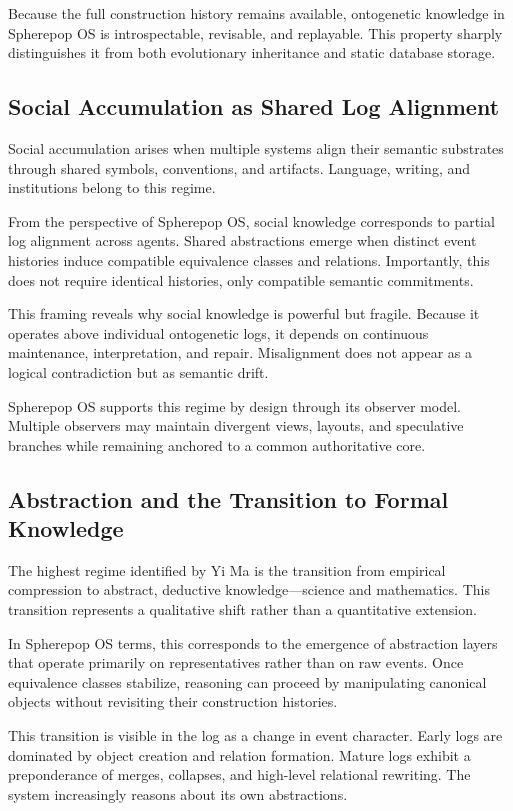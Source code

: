 \documentclass[11pt]{article}
\begin{document}
Because the full construction history remains available, ontogenetic
knowledge in Spherepop OS is introspectable, revisable, and replayable. This
property sharply distinguishes it from both evolutionary inheritance and
static database storage.

\subsection{Social Accumulation as Shared Log Alignment}

Social accumulation arises when multiple systems align their semantic
substrates through shared symbols, conventions, and artifacts. Language,
writing, and institutions belong to this regime.

From the perspective of Spherepop OS, social knowledge corresponds to partial
log alignment across agents. Shared abstractions emerge when distinct event
histories induce compatible equivalence classes and relations. Importantly,
this does not require identical histories, only compatible semantic
commitments.

This framing reveals why social knowledge is powerful but fragile. Because
it operates above individual ontogenetic logs, it depends on continuous
maintenance, interpretation, and repair. Misalignment does not appear as a
logical contradiction but as semantic drift.

Spherepop OS supports this regime by design through its observer model.
Multiple observers may maintain divergent views, layouts, and speculative
branches while remaining anchored to a common authoritative core.

\subsection{Abstraction and the Transition to Formal Knowledge}

The highest regime identified by Yi Ma is the transition from empirical
compression to abstract, deductive knowledge—science and mathematics. This
transition represents a qualitative shift rather than a quantitative
extension.

In Spherepop OS terms, this corresponds to the emergence of abstraction
layers that operate primarily on representatives rather than on raw events.
Once equivalence classes stabilize, reasoning can proceed by manipulating
canonical objects without revisiting their construction histories.

This transition is visible in the log as a change in event character. Early
logs are dominated by object creation and relation formation. Mature logs
exhibit a preponderance of merges, collapses, and high-level relational
rewriting. The system increasingly reasons about its own abstractions.
\end{document}
